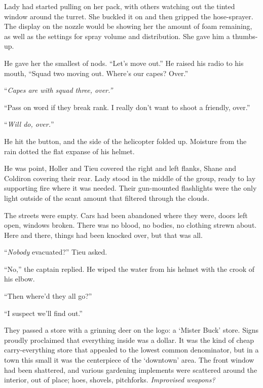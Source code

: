 Lady had started pulling on her pack, with others watching out the tinted window around the turret.  She buckled it on and then gripped the hose-sprayer.  The display on the nozzle would be showing her the amount of foam remaining, as well as the settings for spray volume and distribution.  She gave him a thumbs-up.



He gave her the smallest of nods.  ``Let's move out.''  He raised his radio to his mouth, ``Squad two moving out.  Where's our capes?  Over.''



``\emph{Capes are with squad three, over.''}



``Pass on word if they break rank.  I really don't want to shoot a friendly, over.''



``\emph{Will do, over.}''



He hit the button, and the side of the helicopter folded up.  Moisture from the rain dotted the flat expanse of his helmet.



He was point, Holler and Tieu covered the right and left flanks, Shane and Coldiron covering their rear.  Lady stood in the middle of the group, ready to lay supporting fire where it was needed.  Their gun-mounted flashlights were the only light outside of the scant amount that filtered through the clouds.



The streets were empty.  Cars had been abandoned where they were, doors left open, windows broken.  There was no blood, no bodies, no clothing strewn about.  Here and there, things had been knocked over, but that was all.



``\emph{Nobody} evacuated?'' Tieu asked.



``No,'' the captain replied.  He wiped the water from his helmet with the crook of his elbow.



``Then where'd they all go?''



``I suspect we'll find out.''



They passed a store with a grinning deer on the logo: a `Mister Buck' store.  Signs proudly proclaimed that everything inside was a dollar.  It was the kind of cheap carry-everything store that appealed to the lowest common denominator, but in a town this small it was the centerpiece of the `downtown' area.  The front window had been shattered, and various gardening implements were scattered around the interior, out of place; hoes, shovels, pitchforks.  \emph{Improvised weapons?}



